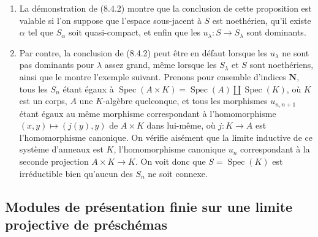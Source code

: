 \begin{remark}[8.4.6]
\label{IV.8.4.6-fr}
\begin{enumerate}[label=(\roman*)]
  \item La démonstration de (8.4.2) montre que la conclusion de cette
  proposition est valable si l'on suppose que l'espace sous-jacent à $S$ est
  noethérien, qu'il existe $\alpha$ tel que $S_\alpha$ soit quasi-compact, et
  enfin que les $u_\lambda:S\to S_\lambda$ sont dominants.

  \item Par contre, la conclusion de (8.4.2) peut être en défaut lorsque les
  $u_\lambda$ ne sont pas dominants pour $\lambda$ assez grand, même lorsque
  les $S_\lambda$ et $S$ sont noethériens, ainsi que le montre l'exemple
  suivant. Prenons pour ensemble d'indices $\mathbf N$, tous les $S_n$ étant
  égaux à
  $\operatorname{Spec}(A\times K)=\operatorname{Spec}(A)\amalg
  \operatorname{Spec}(K)$, où $K$ est un corps, $A$ une $K$-algèbre
  quelconque, et tous les morphismes $u_{n,n+1}$ étant égaux au même morphisme
  correspondant à l'homomorphisme $(x,y)\mapsto(j(y),y)$ de $A\times K$ dans
  lui-même, où $j:K\to A$ est l'homomorphisme canonique. On vérifie aisément
  que la limite inductive de ce système d'anneaux est $K$, l'homomorphisme
  canonique $u_n$ correspondant à la seconde projection $A\times K\to K$. On
  voit donc que $S=\operatorname{Spec}(K)$ est irréductible bien qu'aucun des
  $S_n$ ne soit connexe.
\end{enumerate}
\end{remark}

\subsection{Modules de présentation finie sur une limite projective de préschémas}
\label{subsection:IV.8.5-fr}

